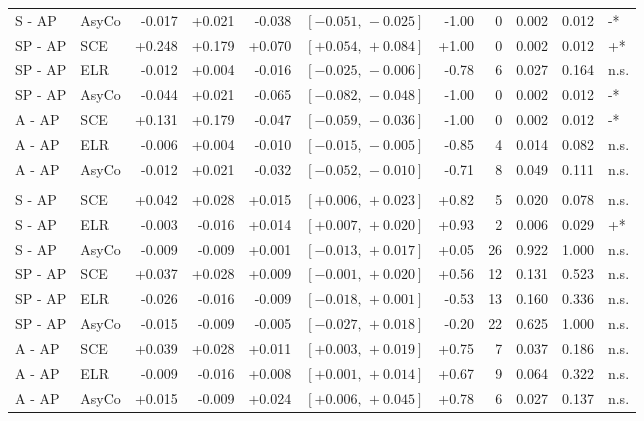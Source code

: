 \begin{table}[htbp]
{\begin{tabular}{llrrrrrrrrl}
S - AP & AsyCo & -0.017 & +0.021 & -0.038 & $[-0.051,\,-0.025]$ & -1.00 & 0 & 0.002 & 0.012 & -* \\
SP - AP & SCE & +0.248 & +0.179 & +0.070 & $[+0.054,\,+0.084]$ & +1.00 & 0 & 0.002 & 0.012 & +* \\
SP - AP & ELR & -0.012 & +0.004 & -0.016 & $[-0.025,\,-0.006]$ & -0.78 & 6 & 0.027 & 0.164 & n.s. \\
SP - AP & AsyCo & -0.044 & +0.021 & -0.065 & $[-0.082,\,-0.048]$ & -1.00 & 0 & 0.002 & 0.012 & -* \\
A - AP & SCE & +0.131 & +0.179 & -0.047 & $[-0.059,\,-0.036]$ & -1.00 & 0 & 0.002 & 0.012 & -* \\
A - AP & ELR & -0.006 & +0.004 & -0.010 & $[-0.015,\,-0.005]$ & -0.85 & 4 & 0.014 & 0.082 & n.s. \\
A - AP & AsyCo & -0.012 & +0.021 & -0.032 & $[-0.052,\,-0.010]$ & -0.71 & 8 & 0.049 & 0.111 & n.s. \\
\addlinespace
\multicolumn{11}{l}{\textit{Macro AUC}} \\
S - AP & SCE & +0.042 & +0.028 & +0.015 & $[+0.006,\,+0.023]$ & +0.82 & 5 & 0.020 & 0.078 & n.s. \\
S - AP & ELR & -0.003 & -0.016 & +0.014 & $[+0.007,\,+0.020]$ & +0.93 & 2 & 0.006 & 0.029 & +* \\
S - AP & AsyCo & -0.009 & -0.009 & +0.001 & $[-0.013,\,+0.017]$ & +0.05 & 26 & 0.922 & 1.000 & n.s. \\
SP - AP & SCE & +0.037 & +0.028 & +0.009 & $[-0.001,\,+0.020]$ & +0.56 & 12 & 0.131 & 0.523 & n.s. \\
SP - AP & ELR & -0.026 & -0.016 & -0.009 & $[-0.018,\,+0.001]$ & -0.53 & 13 & 0.160 & 0.336 & n.s. \\
SP - AP & AsyCo & -0.015 & -0.009 & -0.005 & $[-0.027,\,+0.018]$ & -0.20 & 22 & 0.625 & 1.000 & n.s. \\
A - AP & SCE & +0.039 & +0.028 & +0.011 & $[+0.003,\,+0.019]$ & +0.75 & 7 & 0.037 & 0.186 & n.s. \\
A - AP & ELR & -0.009 & -0.016 & +0.008 & $[+0.001,\,+0.014]$ & +0.67 & 9 & 0.064 & 0.322 & n.s. \\
A - AP & AsyCo & +0.015 & -0.009 & +0.024 & $[+0.006,\,+0.045]$ & +0.78 & 6 & 0.027 & 0.137 & n.s. \\
\bottomrule
\end{tabular}}
\end{table}
